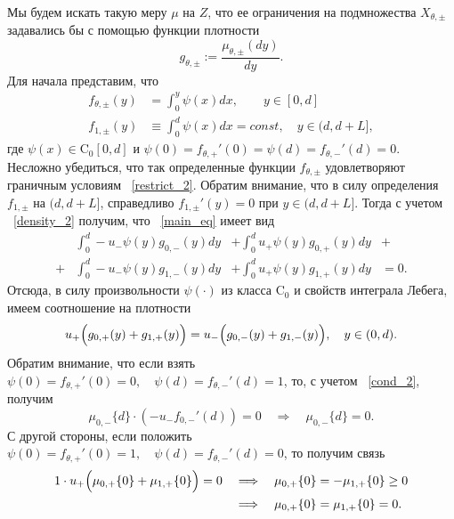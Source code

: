 \documentclass[12pt,a4paper]{article}
\begin{document}
Мы будем искать такую меру $\mu$ на $Z$, что ее ограничения на подмножества $X_{\theta, \pm}$ задавались бы с помощью функции плотности
\begin{equation}\label{density_2}
    g_{\theta, \pm} := \frac{\mu_{\theta, \pm} (dy)}{dy}.
\end{equation}
Для начала представим, что
\begin{equation*}
    \begin{aligned}
        f_{\theta, \pm} (y) &= \displaystyle\int_0^y \psi (x) dx, \qquad y \in [0, d]\\
        f_{1, \pm} (y) &\equiv \displaystyle\int_0^d \psi (x) dx = {const}, \quad y \in (d, d + L],
    \end{aligned}
\end{equation*}
где $\psi (x) \in \mathrm{C}_{0} [0, d]$ и $\psi (0) = f_{\theta, +}' (0) =  \psi (d) = f_{\theta, -}' (d) = 0$. Несложно убедиться, что так определенные функции $f_{\theta, \pm}$ удовлетворяют граничным условиям ~\eqref{restrict_2}. Обратим внимание, что в силу определения $f_{1, \pm}$ на $(d, d + L]$, справедливо $f_{1, \pm}' (y) = 0$ при $y \in (d, d + L]$. Тогда с учетом ~\eqref{density_2} получим, что ~\eqref{main_eq} имеет вид
\begin{equation*}
    \begin{aligned}
    &\int_0^d -u_- \psi (y)  g_{0,-} (y) dy 
    &+ \int_0^d u_+ \psi (y) g_{0,+} (y) dy &+ \\
    + &\int_0^d -u_- \psi (y) g_{1,-} (y) dy
    &+ \int_0^{d} u_+ \psi (y) g_{1,+} (y) dy &= 0.
    \end{aligned}
\end{equation*}
Отсюда, в силу произвольности $\psi (\cdot)$ из класса $\mathrm{C}_0$ и свойств интеграла Лебега, имеем соотношение на плотности
\begin{equation}\label{cond_2}
    u_+ \Bigl(g_{0,+} (y) + g_{1,+} (y) \Bigr) = u_- \Bigl(g_{0,-} (y) + g_{1,-} (y) \Bigr), \quad y \in (0, d).
\end{equation}
Обратим внимание, что если взять $\psi (0) = f_{\theta, +}' (0) = 0, \quad \psi (d) = f_{\theta, -}' (d) = 1$, то, с учетом ~\eqref{cond_2}, получим
$$\mu_{0,-} \{d\} \cdot \left( - u_- f_{0,-}' (d) \right) = 0 \quad \Longrightarrow \quad  \mu_{0,-} \{d\} = 0.$$
С другой стороны, если положить $\psi (0) = f_{\theta, +}' (0) = 1, \quad \psi (d) = f_{\theta, -}' (d) = 0$, то получим связь
\begin{equation*}
    \begin{aligned}
  1 \cdot u_+  \Bigl( \mu_{0,+} \{0\} + \mu_{1,+} \{0\}\Bigr) = 0 \quad &\Longrightarrow \quad \mu_{0,+} \{0\} = - \mu_{1,+} \{0\} \ge 0 \\
  &\Longrightarrow \quad \mu_{0,+} \{0\} = \mu_{1,+} \{0\} = 0.      
    \end{aligned}
\end{equation*}
\end{document}
